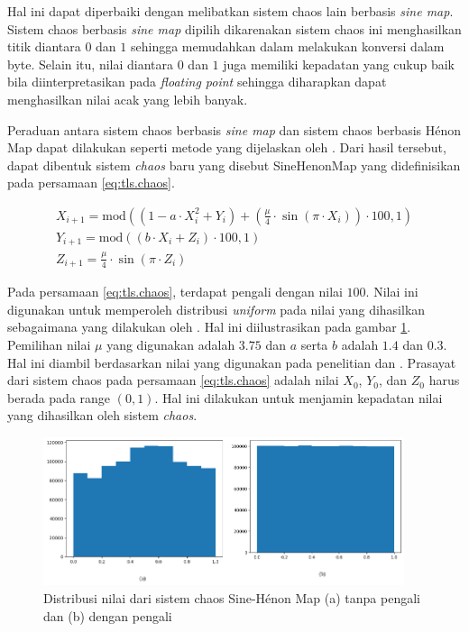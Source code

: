 Hal ini dapat diperbaiki dengan melibatkan sistem chaos lain berbasis \emph{sine map}. Sistem chaos berbasis \emph{sine map} dipilih dikarenakan sistem chaos ini menghasilkan titik diantara $0$ dan $1$ sehingga memudahkan dalam melakukan konversi dalam byte. Selain itu, nilai diantara $0$ dan $1$ juga memiliki kepadatan yang cukup baik bila diinterpretasikan pada \emph{floating point} sehingga diharapkan dapat menghasilkan nilai acak yang lebih banyak.

Peraduan antara sistem chaos berbasis \emph{sine map} dan sistem chaos berbasis Hénon Map dapat dilakukan seperti metode yang dijelaskan oleh \textcite{patel2021}. Dari hasil tersebut, dapat dibentuk sistem \emph{chaos} baru yang disebut SineHenonMap yang didefinisikan pada persamaan \ref{eq:tls.chaos}.

\begin{equation}
  \begin{aligned}
    X_{i+1} = \text{mod}((1 - a \cdot X_i^2 + Y_i) + (\frac{\mu}{4} \cdot \sin{(\pi \cdot X_{i})}) \cdot 100, 1)  \\
    Y_{i+1} = \text{mod}((b \cdot X_i + Z_{i}) \cdot 100, 1) \\
    Z_{i+1} = \frac{\mu}{4} \cdot \sin{(\pi \cdot Z_{i})}
  \end{aligned}
  \label{eq:tls.chaos}
\end{equation}

Pada persamaan \ref{eq:tls.chaos}, terdapat pengali dengan nilai $100$. Nilai ini digunakan untuk memperoleh distribusi \emph{uniform} pada nilai yang dihasilkan sebagaimana yang dilakukan oleh \textcite{nurhaliza2023}. Hal ini diilustrasikan pada gambar \ref{fig:chaos.sinehenonmap.dist}. Pemilihan nilai $\mu$ yang digunakan adalah $3.75$ dan $a$ serta $b$ adalah $1.4$ dan $0.3$. Hal ini diambil berdasarkan nilai yang digunakan pada penelitian \textcite{lin2021} dan \textcite{patel2021}. Prasayat dari sistem chaos pada persamaan \ref{eq:tls.chaos} adalah nilai $X_0$, $Y_0$, dan $Z_0$ harus berada pada range $(0,1)$. Hal ini dilakukan untuk menjamin kepadatan nilai yang dihasilkan oleh sistem \emph{chaos}.

\begin{figure}[!h]
  \centering
  \includegraphics[width=400px]{chapters/res/chapter-3/img/sinehenon.distribution.png}
  \caption{Distribusi nilai dari sistem chaos Sine-Hénon Map (a) tanpa pengali dan (b) dengan pengali} \label{fig:chaos.sinehenonmap.dist}
\end{figure}

